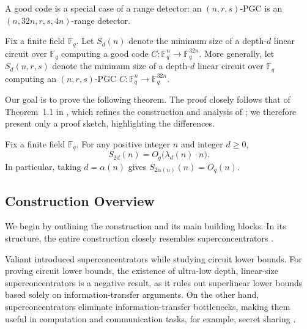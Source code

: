 \documentclass[11pt]{article}
\theoremstyle{named}
\begin{document}
A good code is a special case of a range detector: an $(n, r, s)$-PGC is an $(n, 32n, r, s, 4n)$-range detector.


Fix a finite field $\mathbb{F}_q$. Let $S_d(n)$ denote the minimum size of a depth-$d$ linear circuit over $\mathbb{F}_q$ computing a good code $C : \mathbb{F}_q^n \to \mathbb{F}_q^{32n}$. More generally, let $S_d(n, r, s)$ denote the minimum size of a depth-$d$ linear circuit over $\mathbb{F}_q$ computing an $(n,r,s)$-PGC $C : \mathbb{F}_q^n \to \mathbb{F}_q^{32n}$.


Our goal is to prove the following theorem. The proof closely follows that of Theorem~1.1 in \cite{drucker2023minimum}, which refines the construction and analysis of \cite{GHK+12}; we therefore present only a proof sketch, highlighting the differences.

\begin{theorem}
\label{thm:mother_code}
Fix a finite field $\mathbb{F}_q$. For any positive integer $n$ and integer $d \ge 0$,
\[
S_{2d}(n) = O_q\!\bigl(\lambda_d(n) \cdot n\bigr).
\]
In particular, taking $d = \alpha(n)$ gives $S_{2\alpha(n)}(n) = O_q(n)$.
\end{theorem}


\subsection{Construction Overview}

We begin by outlining the construction and its main building blocks. In its structure, the entire construction closely resembles superconcentrators \cite{Val75, Val76, Val77, DDP+83}.

Valiant introduced superconcentrators while studying circuit lower bounds. For proving circuit lower bounds, the existence of ultra-low depth, linear-size superconcentrators is a negative result, as it rules out superlinear 
lower bounds based solely on information-transfer arguments. On the other hand, superconcentrators eliminate information-transfer bottlenecks, making them useful in computation and communication tasks, for example, secret sharing \cite{Li23}.
\end{document}
